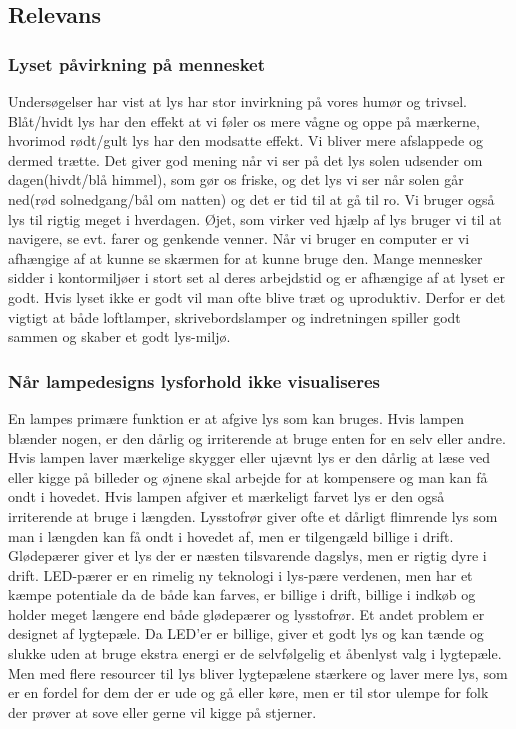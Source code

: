 \subsection{Relevans}
\subsubsection{Lyset påvirkning på mennesket}

Undersøgelser har vist at lys har stor invirkning på vores humør og trivsel.
Blåt/hvidt lys har den effekt at vi føler os mere vågne og oppe på mærkerne\cite{videnskab_dk_paavirkning}, hvorimod rødt/gult lys har den modsatte effekt. Vi bliver mere afslappede og dermed trætte. Det giver god mening når vi ser på det lys solen udsender om dagen(hivdt/blå himmel), som gør os friske, og det lys vi ser når solen går ned(rød solnedgang/bål om natten) og det er tid til at gå til ro. Vi bruger også lys til rigtig meget i hverdagen. Øjet, som virker ved hjælp af lys bruger vi til at navigere, se evt. farer og genkende venner. Når vi bruger en computer er vi afhængige af at kunne se skærmen for at kunne bruge den. Mange mennesker sidder i kontormiljøer i stort set al deres arbejdstid og er afhængige af at lyset er godt. Hvis lyset ikke er godt vil man ofte blive træt og uproduktiv. Derfor er det vigtigt at både loftlamper, skrivebordslamper og indretningen spiller godt sammen og skaber et godt lys-miljø.


\subsubsection{Når lampedesigns lysforhold ikke visualiseres}

En lampes primære funktion er at afgive lys som kan bruges. Hvis lampen blænder nogen, er den dårlig og irriterende at bruge enten for en selv eller andre. Hvis lampen laver mærkelige skygger eller ujævnt lys er den dårlig at læse ved eller kigge på billeder og øjnene skal arbejde for at kompensere og man kan få ondt i hovedet. Hvis lampen afgiver et mærkeligt farvet lys er den også irriterende at bruge i længden. Lysstofrør giver ofte et dårligt flimrende lys som man i længden kan få ondt i hovedet af, men er tilgengæld billige i drift. Glødepærer giver et lys der er næsten tilsvarende dagslys, men er rigtig dyre i drift\cite{videnskab_dk_led}. LED-pærer er en rimelig ny teknologi i lys-pære verdenen, men har et kæmpe potentiale da de både kan farves, er billige i drift, billige i indkøb og holder meget længere end både glødepærer og lysstofrør. Et andet problem er designet af lygtepæle. Da LED'er er billige, giver et godt lys og kan tænde og slukke uden at bruge ekstra energi er de selvfølgelig et åbenlyst valg i lygtepæle. Men med flere resourcer til lys bliver lygtepælene stærkere og laver mere lys, som er en fordel for dem der er ude og gå eller køre, men er til stor ulempe for folk der prøver at sove eller gerne vil kigge på stjerner\cite{dr_dk_lysforurening}.